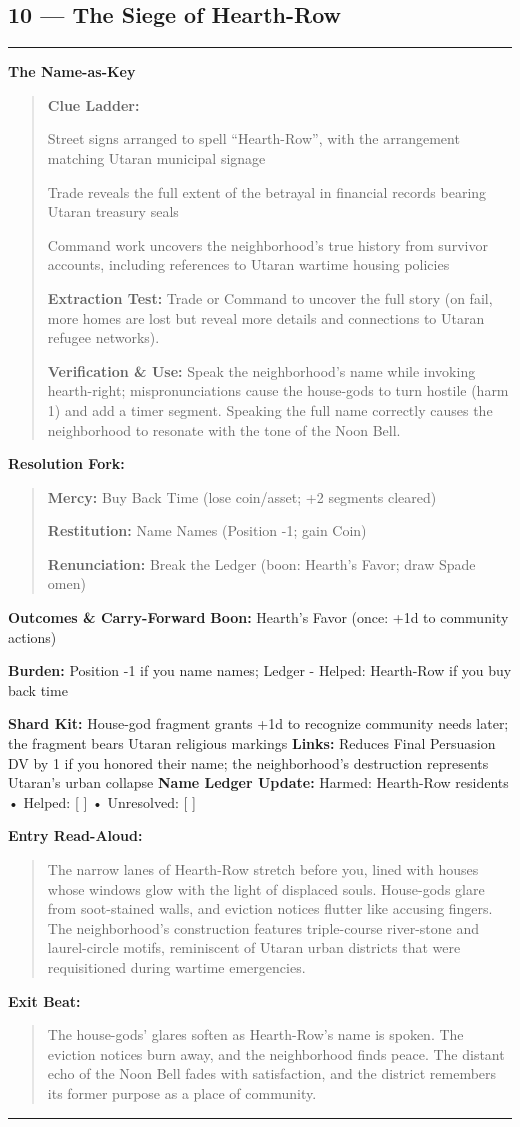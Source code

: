 \documentclass[18pt, letterpaper, twoside]{article}
\newenvironment{floorbox}[1]{%
    \begin{center}
    \begin{minipage}{0.95\textwidth}
    \subsection*{#1}
    \vspace{-0.5em}
    \rule{\textwidth}{0.5pt}
    \vspace{0.5em}
}{%
    \vspace{0.5em}
    \rule{\textwidth}{0.5pt}
    \end{minipage}
    \end{center}
}
\newenvironment{gmnote}[1]{%
    \vspace{0.5em}
    \noindent\textbf{#1}
    \begin{quote}
}{%
    \end{quote}
    \vspace{0.5em}
}
\newenvironment{resolutionbox}{%
    \vspace{0.5em}
    \noindent\textbf{Resolution Fork:}
    \begin{quote}
}{%
    \end{quote}
    \vspace{0.5em}
}
\newenvironment{boxedtext}[1]{%
    \vspace{0.5em}
    \noindent\textbf{#1}
    \begin{quote}
}{%
    \end{quote}
    \vspace{0.5em}
}
\newcommand{\boon}[1]{\noindent\textbf{Boon:} #1\par}
\newcommand{\burden}[1]{\noindent\textbf{Burden:} #1\par}
\newcommand{\entrytext}[1]{\begin{boxedtext}{Entry Read-Aloud:} #1 \end{boxedtext}}
\newcommand{\exittext}[1]{\begin{boxedtext}{Exit Beat:} #1 \end{boxedtext}}
\begin{document}
\begin{floorbox}{10 --- The Siege of Hearth-Row}
\begin{gmnote}{The Name-as-Key}
\textbf{Clue Ladder:}
\begin{description}[leftmargin=*, style=unboxed]
    \item[Gentle Nudge:] Street signs arranged to spell ``Hearth-Row'', with the arrangement matching Utaran municipal signage
    \item[Actionable Lead:] Trade reveals the full extent of the betrayal in financial records bearing Utaran treasury seals
    \item[Aha! Proof:] Command work uncovers the neighborhood's true history from survivor accounts, including references to Utaran wartime housing policies
\end{description}

\textbf{Extraction Test:} Trade or Command to uncover the full story (on fail, more homes are lost but reveal more details and connections to Utaran refugee networks).

\textbf{Verification \& Use:} Speak the neighborhood's name while invoking hearth-right; mispronunciations cause the house-gods to turn hostile (harm 1) and add a timer segment. Speaking the full name correctly causes the neighborhood to resonate with the tone of the Noon Bell.
\end{gmnote}

\begin{resolutionbox}
\textbf{Mercy:} Buy Back Time (lose coin/asset; +2 segments cleared)

\textbf{Restitution:} Name Names (Position -1; gain Coin)

\textbf{Renunciation:} Break the Ledger (boon: Hearth's Favor; draw Spade omen)
\end{resolutionbox}

\textbf{Outcomes \& Carry-Forward}
\boon{Hearth's Favor (once: +1d to community actions)}
\burden{Position -1 if you name names; Ledger - Helped: Hearth-Row if you buy back time}
\textbf{Shard Kit:} House-god fragment grants +1d to recognize community needs later; the fragment bears Utaran religious markings
\textbf{Links:} Reduces Final Persuasion DV by 1 if you honored their name; the neighborhood's destruction represents Utaran's urban collapse
\textbf{Name Ledger Update:} Harmed: Hearth-Row residents • Helped: [ ] • Unresolved: [ ]

\entrytext{The narrow lanes of Hearth-Row stretch before you, lined with houses whose windows glow with the light of displaced souls. House-gods glare from soot-stained walls, and eviction notices flutter like accusing fingers. The neighborhood's construction features triple-course river-stone and laurel-circle motifs, reminiscent of Utaran urban districts that were requisitioned during wartime emergencies.}

\exittext{The house-gods' glares soften as Hearth-Row's name is spoken. The eviction notices burn away, and the neighborhood finds peace. The distant echo of the Noon Bell fades with satisfaction, and the district remembers its former purpose as a place of community.}
\end{floorbox}
\end{document}
